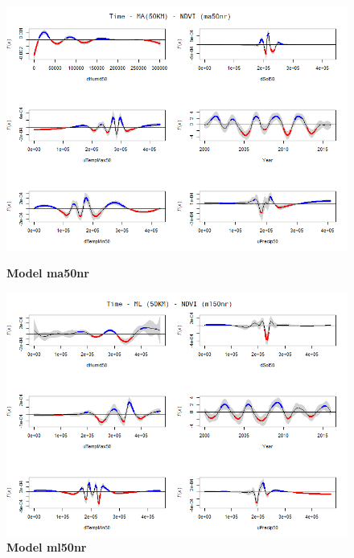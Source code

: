 \begin{figure}[H]

    \begin{minipage}{0.8\textwidth}
        \centering
        \includegraphics[width=1.2\textwidth]{ma50nr.png} %
        \caption{\textbf{Model ma50nr}}
    \end{minipage}\hfill
    \begin{minipage}{0.8\textwidth}
        \centering
        \includegraphics[width=1.2\textwidth]{ml50nr.png} %
        \caption{\textbf{Model ml50nr}}
    \end{minipage}
\end{figure}

